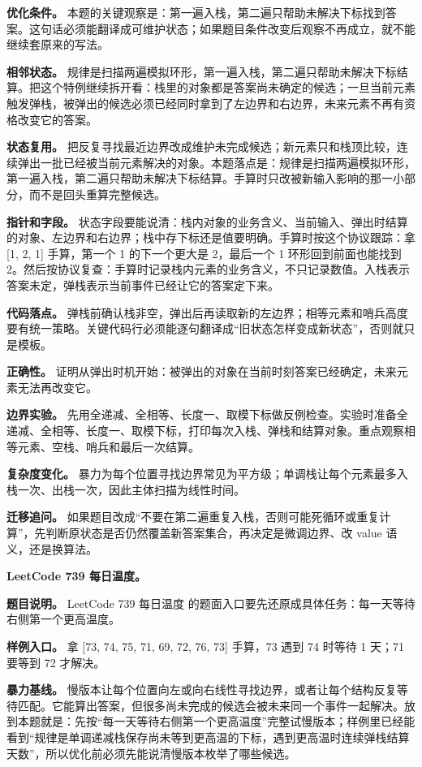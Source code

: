 \textbf{优化条件。} 本题的关键观察是：第一遍入栈，第二遍只帮助未解决下标找到答案。这句话必须能翻译成可维护状态；如果题目条件改变后观察不再成立，就不能继续套原来的写法。

\textbf{相邻状态。} 规律是扫描两遍模拟环形，第一遍入栈，第二遍只帮助未解决下标结算。把这个特例继续拆开看：栈里的对象都是答案尚未确定的候选；一旦当前元素触发弹栈，被弹出的候选必须已经同时拿到了左边界和右边界，未来元素不再有资格改变它的答案。

\textbf{状态复用。} 把反复寻找最近边界改成维护未完成候选；新元素只和栈顶比较，连续弹出一批已经被当前元素解决的对象。本题落点是：规律是扫描两遍模拟环形，第一遍入栈，第二遍只帮助未解决下标结算。手算时只改被新输入影响的那一小部分，而不是回头重算完整候选。

\textbf{指针和字段。} 状态字段要能说清：栈内对象的业务含义、当前输入、弹出时结算的对象、左边界和右边界；栈中存下标还是值要明确。手算时按这个协议跟踪：拿 [1, 2, 1] 手算，第一个 1 的下一个更大是 2，最后一个 1 环形回到前面也能找到 2。然后按协议复查：手算时记录栈内元素的业务含义，不只记录数值。入栈表示答案未定，弹栈表示当前事件已经让它的答案定下来。

\textbf{代码落点。} 弹栈前确认栈非空，弹出后再读取新的左边界；相等元素和哨兵高度要有统一策略。关键代码行必须能逐句翻译成“旧状态怎样变成新状态”，否则就只是模板。

\textbf{正确性。} 证明从弹出时机开始：被弹出的对象在当前时刻答案已经确定，未来元素无法再改变它。

\textbf{边界实验。} 先用全递减、全相等、长度一、取模下标做反例检查。实验时准备全递减、全相等、长度一、取模下标，打印每次入栈、弹栈和结算对象。重点观察相等元素、空栈、哨兵和最后一次结算。

\textbf{复杂度变化。} 暴力为每个位置寻找边界常见为平方级；单调栈让每个元素最多入栈一次、出栈一次，因此主体扫描为线性时间。

\textbf{迁移追问。} 如果题目改成“不要在第二遍重复入栈，否则可能死循环或重复计算”，先判断原状态是否仍然覆盖新答案集合，再决定是微调边界、改 value 语义，还是换算法。

\noindent\textbf{LeetCode 739 每日温度。}

\textbf{题目说明。} LeetCode 739 每日温度 的题面入口要先还原成具体任务：每一天等待右侧第一个更高温度。

\textbf{样例入口。} 拿 [73, 74, 75, 71, 69, 72, 76, 73] 手算，73 遇到 74 时等待 1 天；71 要等到 72 才解决。

\textbf{暴力基线。} 慢版本让每个位置向左或向右线性寻找边界，或者让每个结构反复等待匹配。它能算出答案，但很多尚未完成的候选会被未来同一个事件一起解决。放到本题就是：先按“每一天等待右侧第一个更高温度”完整试慢版本；样例里已经能看到“规律是单调递减栈保存尚未等到更高温的下标，遇到更高温时连续弹栈结算天数”，所以优化前必须先能说清慢版本枚举了哪些候选。

